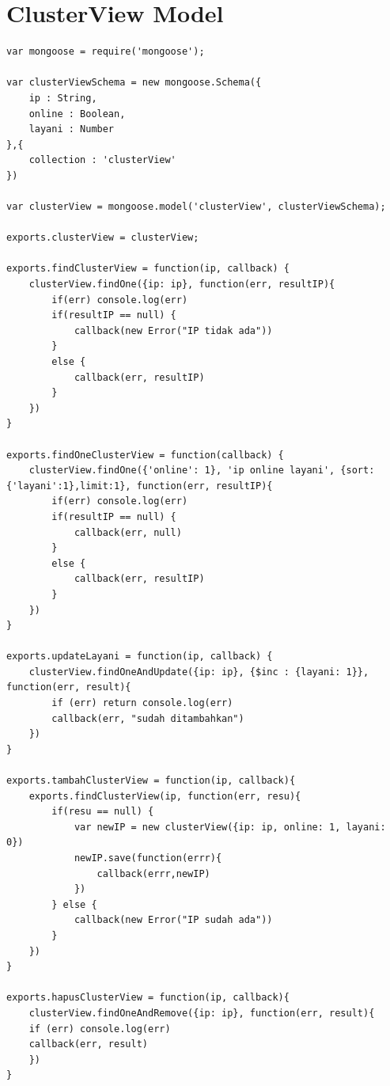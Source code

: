\documentclass{ta-its}
\begin{document}
		\section{ClusterView Model}
			\begin{lstlisting}[frame=single,tabsize=2,breaklines,caption={ClusterView Model untuk Koleksi ClusterView},label=clusterViewModel]	
var mongoose = require('mongoose');

var clusterViewSchema = new mongoose.Schema({
	ip : String,
	online : Boolean,
	layani : Number
},{
	collection : 'clusterView'
})

var clusterView = mongoose.model('clusterView', clusterViewSchema);

exports.clusterView = clusterView;

exports.findClusterView = function(ip, callback) {
	clusterView.findOne({ip: ip}, function(err, resultIP){
		if(err) console.log(err)
		if(resultIP == null) {
			callback(new Error("IP tidak ada"))
		}
		else {
			callback(err, resultIP)
		}
	})
}

exports.findOneClusterView = function(callback) {
	clusterView.findOne({'online': 1}, 'ip online layani', {sort:{'layani':1},limit:1}, function(err, resultIP){
		if(err) console.log(err)
		if(resultIP == null) {
			callback(err, null)
		}
		else {
			callback(err, resultIP)
		}
	})
}

exports.updateLayani = function(ip, callback) {
	clusterView.findOneAndUpdate({ip: ip}, {$inc : {layani: 1}}, function(err, result){
		if (err) return console.log(err)
		callback(err, "sudah ditambahkan")
	})
}

exports.tambahClusterView = function(ip, callback){
	exports.findClusterView(ip, function(err, resu){
		if(resu == null) {
			var newIP = new clusterView({ip: ip, online: 1, layani: 0})
			newIP.save(function(errr){
				callback(errr,newIP)
			})
		} else {
			callback(new Error("IP sudah ada"))
		}
	})
}

exports.hapusClusterView = function(ip, callback){
	clusterView.findOneAndRemove({ip: ip}, function(err, result){
	if (err) console.log(err)
	callback(err, result)
	})
}
			
			\end{lstlisting}
\end{document}
